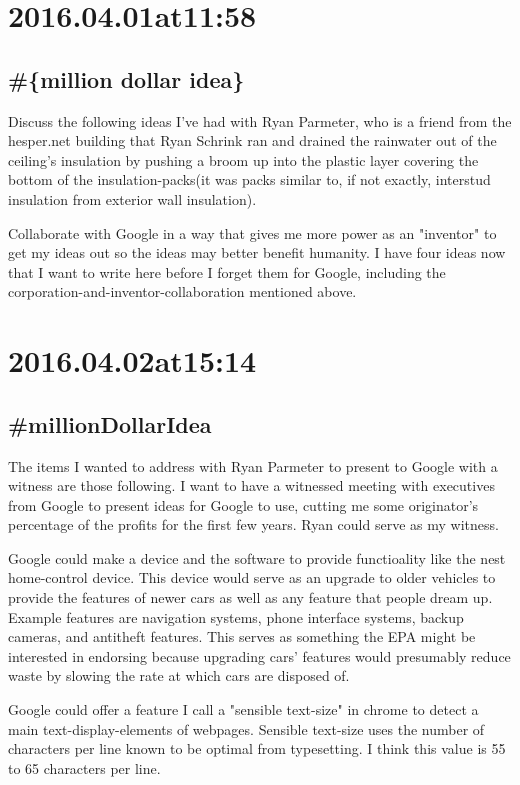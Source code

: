 \begin{enumerate}
\section*{ 2016.04.01at11:58 }
\subsection*{\#\{million dollar idea\}}
Discuss the following ideas I've had with Ryan Parmeter, who is a friend from the hesper.net building that Ryan Schrink ran and drained the rainwater out of the ceiling's insulation by pushing a broom up into the plastic layer covering the bottom of the insulation-packs(it was packs similar to, if not exactly, interstud insulation from exterior wall insulation).

Collaborate with Google in a way that gives me more power as an "inventor" to get my ideas out so the ideas may better benefit humanity. I have four ideas now that I want to write here before I forget them for Google, including the corporation-and-inventor-collaboration mentioned above.  

\section*{ 2016.04.02at15:14 }
\subsection*{\#millionDollarIdea}
The items I wanted to address with Ryan Parmeter to present to Google with a witness are those following. I want to have a witnessed meeting with executives from Google to present ideas for Google to use, cutting me some originator's percentage of the profits for the first few years. Ryan could serve as my witness.

Google could make a device and the software to provide functioality like the nest home-control device. This device would serve as an upgrade to older vehicles to provide the features of newer cars as well as any feature that people dream up. Example features are navigation systems, phone interface systems, backup cameras, and antitheft features. This serves as something the EPA might be interested in endorsing because upgrading cars' features would presumably reduce waste by slowing the rate at which cars are disposed of.

Google could offer a feature I call a "sensible text-size" in chrome to detect a main text-display-elements of webpages. Sensible text-size uses the number of characters per line known to be optimal from typesetting. I think this value is 55 to 65 characters per line.


\end{enumerate}

